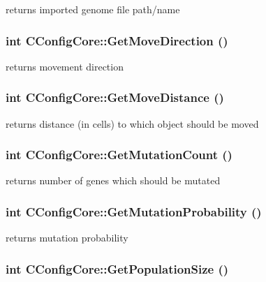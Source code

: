 \label{classCConfigCore_a701fd27f77ab5e83d5e050a5bbaadc80}
returns imported genome file path/name \hypertarget{classCConfigCore_add488b09f744e3aa3123099cb6fc0a7f}{
\subsubsection[{GetMoveDirection}]{\setlength{\rightskip}{0pt plus 5cm}int CConfigCore::GetMoveDirection ()}}
\label{classCConfigCore_add488b09f744e3aa3123099cb6fc0a7f}
returns movement direction \hypertarget{classCConfigCore_abd32b0a6c99afe26029efe8a27590010}{
\subsubsection[{GetMoveDistance}]{\setlength{\rightskip}{0pt plus 5cm}int CConfigCore::GetMoveDistance ()}}
\label{classCConfigCore_abd32b0a6c99afe26029efe8a27590010}
returns distance (in cells) to which object should be moved \hypertarget{classCConfigCore_a8d88cdf520f235a366e4d7f2a5b07e8d}{
\subsubsection[{GetMutationCount}]{\setlength{\rightskip}{0pt plus 5cm}int CConfigCore::GetMutationCount ()}}
\label{classCConfigCore_a8d88cdf520f235a366e4d7f2a5b07e8d}
returns number of genes which should be mutated \hypertarget{classCConfigCore_a0afa9032f44f906530344f1f92906567}{
\subsubsection[{GetMutationProbability}]{\setlength{\rightskip}{0pt plus 5cm}int CConfigCore::GetMutationProbability ()}}
\label{classCConfigCore_a0afa9032f44f906530344f1f92906567}
returns mutation probability \hypertarget{classCConfigCore_af9e336726122526a8e8e84e45e21ad34}{
\subsubsection[{GetPopulationSize}]{\setlength{\rightskip}{0pt plus 5cm}int CConfigCore::GetPopulationSize ()}}
